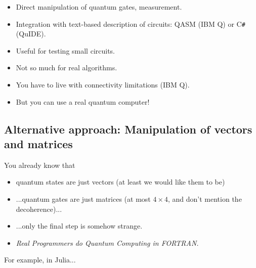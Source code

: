 \documentclass{beamer}
\begin{document}
\begin{frame}{\insertsection}{\insertsubsection}
    \begin{itemize}
        \item<1-> Direct manipulation of quantum gates, measurement.
        \item<2-> Integration with text-based description of circuits: QASM 
        (IBM Q) or C\texttt{\#} (QuIDE).
        \item<3-> Useful for testing small circuits.
        \item<4-> Not so much for real algorithms.
        \item<5-> You have to live with connectivity limitations (IBM Q).
        \item<6-> But you can use a real quantum computer!
    \end{itemize}
\end{frame}   
    

\subsection{Alternative approach: Manipulation of vectors and matrices}

\begin{frame}{\insertsection}{\insertsubsection}
    You already know that
    \begin{itemize}
        \item<1-> quantum states are just vectors (at least we would like them 
        to 
        be)
        \item<2-> ...quantum gates are just matrices (at most $4\times 4$, and 
        don't mention the decoherence)...
        \item<3-> ...only the final step is somehow strange.
        \item<4->{\emph{Real Programmers do Quantum Computing in FORTRAN.}}
    \end{itemize}

\end{frame}

\begin{frame}{\insertsection}{\insertsubsection}
For example, in Julia... \\[12pt] 
\end{frame}
\end{document}

